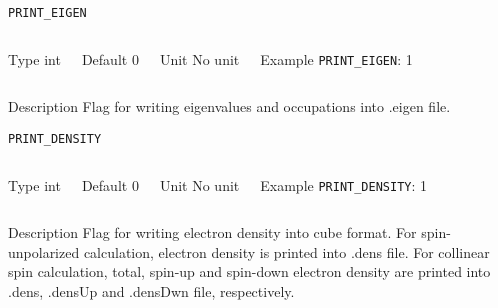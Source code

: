 \begin{frame}[allowframebreaks]{\texttt{PRINT\_EIGEN}} \label{PRINT_EIGEN}
\vspace*{-12pt}
\begin{columns}
\begin{block}{Type}
int
\end{block}

\begin{block}{Default}
0
\end{block}

\begin{block}{Unit}
No unit
\end{block}

\begin{block}{Example}
\texttt{PRINT\_EIGEN}: 1
\end{block}
\end{columns}

\begin{block}{Description}
Flag for writing eigenvalues and occupations into .eigen file.
\end{block}

\end{frame}


\begin{frame}[allowframebreaks]{\texttt{PRINT\_DENSITY}} \label{PRINT_DENSITY}
\vspace*{-12pt}
\begin{columns}
\begin{block}{Type}
int
\end{block}

\begin{block}{Default}
0
\end{block}

\begin{block}{Unit}
No unit
\end{block}

\begin{block}{Example}
\texttt{PRINT\_DENSITY}: 1
\end{block}
\end{columns}

\begin{block}{Description}
Flag for writing electron density into cube format. For spin-unpolarized calculation, electron density is printed into .dens file. For collinear spin calculation, total, spin-up and spin-down electron density are printed into .dens, .densUp and .densDwn file, respectively.
\end{block}

\end{frame}



